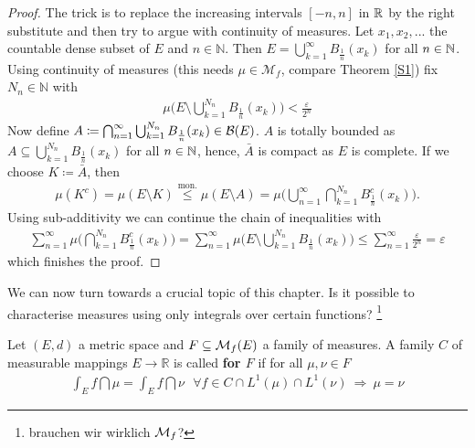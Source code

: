 \begin{proof}[Proof]
	The trick is to replace the increasing intervals $[-n,n]$ in $\mathbb{R}$ by the right substitute and then try to argue with continuity of measures. Let $x_1,x_2,...$ the countable dense subset of $E$ and $n\in\mathbb{N}$. Then $E = \bigcup\limits_{k=1}^{\infty} B_{\frac{1}{n}}(x_k)$ for all $n\in\mathbb{N}$. Using continuity of measures (this needs $\mu\in \mathcal M_f$, compare Theorem \ref{S1}) fix $N_n \in \mathbb{N}$ with 
	\begin{align*}
		\mu \Big( E \text{\textbackslash} \bigcup\limits_{k=1}^{N_n}B_{\frac{1}{n}}(x_k)\Big) < \frac{\varepsilon}{2^n}
	\end{align*}
	Now define $A \coloneqq \bigcap_{n=1}^{\infty} \bigcup_{k=1}^{N_n}B_{\frac{1}{n}}(x_k) \in\mathcal{B}(E)$. $A$ is totally bounded as $A\subseteq \bigcup_{k=1}^{N_n} B_{\frac{1}{n}}(x_k)$ for all $n\in\mathbb{N}$, hence, $\bar{A}$ is compact as $E$ is complete. If we choose $K \coloneqq \bar{A}$, then
	\begin{align*}
		\mu (K^c) = \mu (E \text{\textbackslash} K ) 
				\overset{\text{mon.}}{\leq} \mu (E \text{\textbackslash} A ) 
				= \mu \bigg( \bigcup_{n=1}^{\infty} \bigcap_{k=1}^{N_n}B_{\frac{1}{n}}^c (x_k) \bigg).
	\end{align*}			
	Using sub-additivity we can continue the chain of inequalities with
	\begin{align*}
				\sum\limits_{n=1}^{\infty} \mu \bigg( \bigcap\limits_{k=1}^{N_n} B_{\frac{1}{n}}^c (x_k) \bigg) 
				= \sum\limits_{n=1}^{\infty} \mu \bigg( E \text{\textbackslash} \bigcup\limits_{k=1}^{N_n} B_{\frac{1}{n}}(x_k) \bigg)
				\leq \sum\limits_{n=1}^{\infty}\frac{\varepsilon}{2^n}
				= \varepsilon
	\end{align*}
	which finishes the proof.
\end{proof}
We can now turn towards a crucial topic of this chapter. Is it possible to characterise measures using only integrals over certain functions?
\footnote{brauchen wir wirklich $\mathcal{M}_f$?}
\begin{ldef}
\begin{deff}
	Let $(E,d)$ a metric space and $F \subseteq \mathcal{M}_f(E)$ a family of measures. A family $C$ of measurable mappings $E \to \mathbb{R}$ is called \textbf{ for $F$} if for all $\mu,\nu \in F$
	\begin{align*}
		\int_E f\dint \mu = \int_E f\dint \nu \:\:\: \forall f \in C \cap L^1(\mu)\cap L^1(\nu)\: \Rightarrow \: \mu = \nu
	\end{align*}
\end{deff}
\end{ldef}
